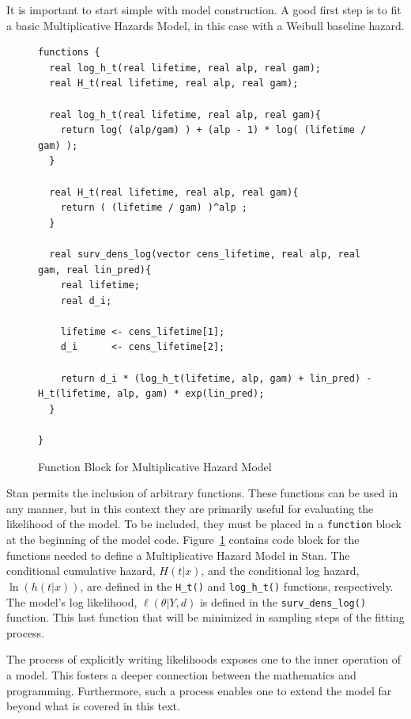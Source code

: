 It is important to start simple with model construction. A good first step is to fit a basic Multiplicative Hazards Model, in this case with a Weibull baseline hazard. 

\begin{figure}[htbp]
    \centering
    \begin{lstlisting}[belowskip=-2 \baselineskip]
functions {
  real log_h_t(real lifetime, real alp, real gam);
  real H_t(real lifetime, real alp, real gam);
  
  real log_h_t(real lifetime, real alp, real gam){
    return log( (alp/gam) ) + (alp - 1) * log( (lifetime / gam) );
  }
  
  real H_t(real lifetime, real alp, real gam){
    return ( (lifetime / gam) )^alp ;
  }
  
  real surv_dens_log(vector cens_lifetime, real alp, real gam, real lin_pred){
    real lifetime;
    real d_i;
  
    lifetime <- cens_lifetime[1];
    d_i      <- cens_lifetime[2];
  
    return d_i * (log_h_t(lifetime, alp, gam) + lin_pred) - H_t(lifetime, alp, gam) * exp(lin_pred);
  }

}
    \end{lstlisting}
    \caption{Function Block for Multiplicative Hazard Model}
    \label{mhazm_funs}
\end{figure}


Stan permits the inclusion of arbitrary functions. These functions can be used in any manner, but in this context they are primarily useful for evaluating the likelihood of the model. To be included, they must be placed in a \lstinline{function} block at the beginning of the model code. Figure~\ref{mhazm_funs} contains code block for the functions needed to define a Multiplicative Hazard Model in Stan. The conditional cumulative hazard, $H(t|x)$, and the conditional log hazard, $\ln(h(t|x))$, are defined in the \lstinline{H_t()} and \lstinline{log_h_t()} functions, respectively. The model's log likelihood, $\ell(\theta|Y, d)$ is defined in the \lstinline{surv_dens_log()} function. This last function that will be minimized in sampling steps of the fitting process. 

The process of explicitly writing likelihoods exposes one to the inner operation of a model. This fosters a deeper connection between the mathematics and programming. Furthermore, such a process enables one to extend the model far beyond what is covered in this text.

